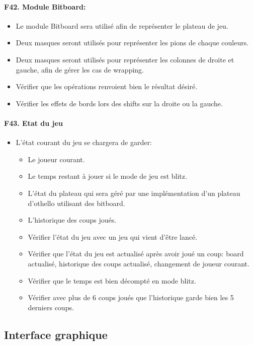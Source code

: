 \documentclass[a4paper,12pt]{article}
\begin{document}
\paragraph{F42. Module Bitboard:}
\begin{itemize}
  \item Le module Bitboard sera utilisé afin de représenter le plateau de jeu.
  \item Deux masques seront utilisés pour représenter les pions de chaque couleurs.
  \item Deux masques seront utilisés pour représenter les colonnes de droite et gauche,
        afin de gérer les cas de wrapping.
  \item Vérifier que les opérations renvoient bien le résultat désiré.
  \item Vérifier les effets de bords lors des shifts sur la droite ou la gauche.
\end{itemize}

\paragraph{F43. Etat du jeu}
\begin{itemize}
  \item L'état courant du jeu se chargera de garder:
        \begin{itemize}
          \item Le joueur courant.
          \item Le temps restant à jouer si le mode de jeu est blitz.
          \item L'état du plateau qui sera géré par une implémentation d'un plateau d'othello
                utilisant des bitboard.
          \item L'historique des coups joués.
          \item Vérifier l'état du jeu avec un jeu qui vient d'être lancé.
          \item Vérifier que l'état du jeu est actualisé après avoir joué un coup: board
                actualisé, historique des coups actualisé, changement de joueur courant.
          \item Vérifier que le temps est bien décompté en mode blitz.
          \item Vérifier avec plus de 6 coups joués que l'historique garde bien les 5 derniers
                coups.
        \end{itemize}
\end{itemize}

\subsection{Interface graphique}
\end{document}
